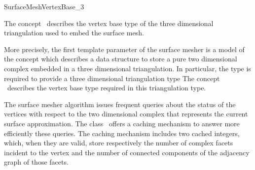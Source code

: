 
\begin{ccRefConcept}{SurfaceMeshVertexBase_3}


\ccDefinition
  
The concept \ccRefName\ describes the vertex base type
of the three dimensional triangulation used
to embed the surface mesh.

More precisely,
the first template parameter  of the surface mesher
is a model of the concept 
which describes a data structure to store
a pure two dimensional complex 
embedded in a three dimensional triangulation.
In particular, the type  is required to provide
a three dimensional triangulation type
The concept \ccRefName\ describes the vertex base type
required in this triangulation type.





\ccGeneralizes



The surface mesher algorithm issues frequent queries
about the status of the vertices  with respect to the
two dimensional complex that represents the current
surface approximation.
The class \ccRefName\ offers a caching mechanism
to answer  more efficiently these queries.
The caching mechanism includes two cached integers, which, when they
are valid, store respectively the number of complex
facets incident to the vertex and the number
of connected components  of the adjacency graph of those facets.








\ccCreation
{}  %



\end{ccRefConcept}
